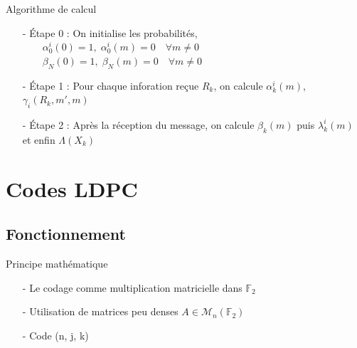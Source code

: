 \documentclass[11pt]{beamer}
\begin{document}
\begin{frame}{Algorithme de calcul}
	\begin{itemize}
		\item[-] \'Etape 0 : On initialise les probabilit\'es, \\
					$\qquad \alpha_0^i(0) = 1, \; \alpha_0^i(m) = 0 \quad \forall m \neq 0$\\
					$\qquad \beta_N(0) = 1, \; \beta_N(m) = 0 \quad \forall m \neq 0$
		\item[-] \'Etape 1 : Pour chaque inforation re\c{c}ue $R_k$, on calcule $\alpha_k^i(m)$, $\gamma_i(R_k, m', m)$
		\item[-] \'Etape 2 : Apr\`es la r\'eception du message, on calcule  $\beta_k(m)$ puis  $\lambda_k^i(m)$ et enfin $\Lambda(X_k)$
	\end{itemize}
\end{frame}


\section{Codes LDPC}
\subsection{Fonctionnement}


\begin{frame}{Principe math\'ematique}
	\begin{itemize}
		\item[-] Le codage comme multiplication matricielle dans $\mathbb{F}_2$
		\item[-] Utilisation de matrices peu denses $A \in \mathcal{M}_n(\mathbb{F}_2)$
		\item[-] Code (n, j, k)
	\end{itemize}
\end{frame}
\end{document}
